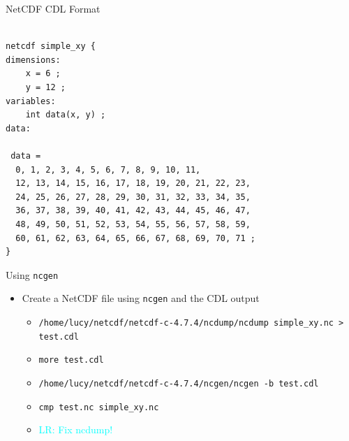 \documentclass[compress,11pt,xcolor=svgnames,aspectratio=169]{beamer}
\newcommand{\lr}[1]{\textcolor{cyan}{LR: #1}}
\begin{document}
\begin{frame}[fragile]{NetCDF CDL Format}

{\footnotesize

\begin{verbatim}

netcdf simple_xy {
dimensions:
	x = 6 ;
	y = 12 ;
variables:
	int data(x, y) ;
data:

 data =
  0, 1, 2, 3, 4, 5, 6, 7, 8, 9, 10, 11,
  12, 13, 14, 15, 16, 17, 18, 19, 20, 21, 22, 23,
  24, 25, 26, 27, 28, 29, 30, 31, 32, 33, 34, 35,
  36, 37, 38, 39, 40, 41, 42, 43, 44, 45, 46, 47,
  48, 49, 50, 51, 52, 53, 54, 55, 56, 57, 58, 59,
  60, 61, 62, 63, 64, 65, 66, 67, 68, 69, 70, 71 ;
}

\end{verbatim}

}

\end{frame}

\begin{frame}[fragile]{Using \texttt{ncgen}}

\begin{itemize}

  \item Create a NetCDF file using \verb|ncgen| and the CDL output

    \begin{itemize}

      \item \verb|/home/lucy/netcdf/netcdf-c-4.7.4/ncdump/ncdump simple_xy.nc > test.cdl|
      \item \verb|more test.cdl|
      \item \verb|/home/lucy/netcdf/netcdf-c-4.7.4/ncgen/ncgen -b test.cdl|
      \item \verb|cmp test.nc simple_xy.nc|
      \item \lr{Fix ncdump!}

    \end{itemize}

\end{itemize}

\end{frame}
\end{document}
